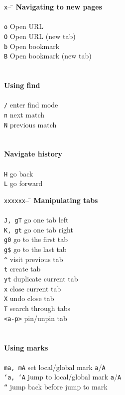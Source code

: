\documentclass{article}
\newcommand{\narrowtabhead}{\texttt{x}-- \= \kill}
\newcommand{\widetabhead}{\texttt{xxxxxx}-- \= \kill}
\begin{document}
\begin{multicols*}{4}
    \begin{tabbing}
      \narrowtabhead
      \textbf{Navigating to new pages} \\
      \\
      \texttt{o} \> Open URL \\
      \texttt{O} \> Open URL (new tab) \\
      \texttt{b} \> Open bookmark \\
      \texttt{B} \> Open bookmark (new tab) \\
      \\
      \\
      \textbf{Using find} \\
      \\
      \texttt{/} \> enter find mode \\
      \texttt{n} \> next match \\
      \texttt{N} \> previous match \\
      \\
      \\
      \textbf{Navigate history} \\
      \\
      \texttt{H} \> go back \\
      \texttt{L} \> go forward \\
    \end{tabbing}
    
    \columnbreak
    
    \begin{tabbing}
      \widetabhead
      \textbf{Manipulating tabs} \\
      \\
      \texttt{J, gT} \> go one tab left \\
      \texttt{K, gt} \> go one tab right \\
      \texttt{g0}    \> go to the first tab \\
      \texttt{g\$}   \> go to the last tab \\
      \texttt{\^}    \> visit previous tab \\
      \texttt{t}     \> create tab \\
      \texttt{yt}    \> duplicate current tab \\
      \texttt{x}     \> close current tab \\
      \texttt{X}     \> undo close tab \\
      \texttt{T}     \> search through tabs \\
      \texttt{<a-p>} \> pin/unpin tab \\
      \\
      \\
      \textbf{Using marks} \\
      \\
      \texttt{ma, mA} \> set local/global mark \texttt{a}/\texttt{A} \\
      \texttt{`a, `A} \> jump to local/global mark \texttt{a}/\texttt{A} \\
      \texttt{``}     \> jump back before jump to mark \\
    \end{tabbing}
    

\end{multicols*}
\end{document}
